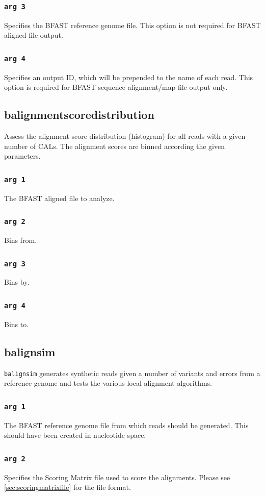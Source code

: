 \documentclass[a4paper,12pt]{book}
\newcommand{\TT}[1]{{\tt #1}} %
\newcommand{\BRGF}{BFAST reference genome file} %
\newcommand{\BAF}{BFAST aligned file} %
\newcommand{\BSAMF}{BFAST sequence alignment/map file} %
\begin{document}
\subsubsection{\TT{arg 3}}
Specifies the \BRGF{}.
This option is not required for \BAF{} output.
\subsubsection{\TT{arg 4}}
Specifies an output ID, which will be prepended to the name of each read.
This option is required for \BSAMF{} output only.
\subsection{balignmentscoredistribution}
\label{sec:balignmentscoredistribution}
Assess the alignment score distribution (histogram) for all reads with a given number of CALs.
The alignment scores are binned according the given parameters.
\subsubsection{\TT{arg 1}}
The \BAF{} to analyze.
\subsubsection{\TT{arg 2}}
Bins from.
\subsubsection{\TT{arg 3}}
Bins by.
\subsubsection{\TT{arg 4}}
Bins to.
\subsection{balignsim}
\label{sec:balignsim}
\TT{balignsim} generates synthetic reads given a number of variants and errors from a reference genome and tests the various local alignment algorithms.

\subsubsection{\TT{arg 1}}
The \BRGF{} from which reads should be generated.
This should have been created in nucleotide space.
\subsubsection{\TT{arg 2}}
Specifies the Scoring Matrix file used to score the alignments.
Please see \autoref{sec:scoringmatrixfile} for the file format.
\end{document}
